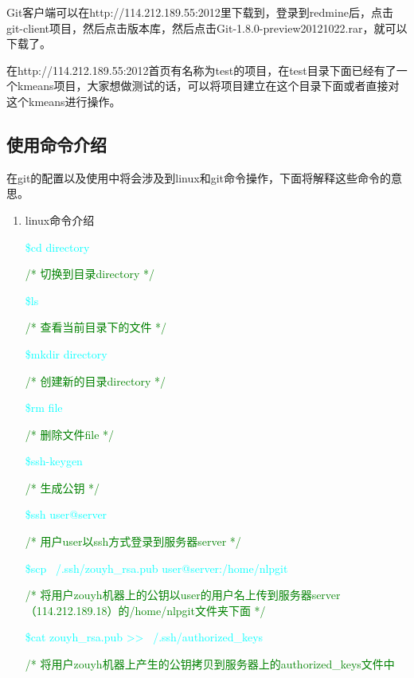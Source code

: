 Git客户端可以在http://114.212.189.55:2012里下载到，登录到redmine后，点击git-client项目，然后点击版本库，然后点击Git-1.8.0-preview20121022.rar，就可以下载了。

在http://114.212.189.55:2012首页有名称为test的项目，在test目录下面已经有了一个kmeans项目，大家想做测试的话，可以将项目建立在这个目录下面或者直接对这个kmeans进行操作。

\subsection{使用命令介绍}
在git的配置以及使用中将会涉及到linux和git命令操作，下面将解释这些命令的意思。

\begin{enumerate}
\item linux命令介绍

\textcolor{cyan}{\$cd directory}

\textcolor{green}{/* 切换到目录directory */}

\textcolor{cyan}{\$ls}
                                                              
\textcolor{green}{/* 查看当前目录下的文件 */}

\textcolor{cyan}{\$mkdir directory}                                                

\textcolor{green}{/* 创建新的目录directory */}

\textcolor{cyan}{\$rm file}
                                                          
\textcolor{green}{/* 删除文件file */}

\textcolor{cyan}{\$ssh-keygen}                                                      

\textcolor{green}{/* 生成公钥 */}

\textcolor{cyan}{\$ssh user@server}  
                                    
\textcolor{green}{/* 用户user以ssh方式登录到服务器server */}

\textcolor{cyan}{\$scp ~/.ssh/zouyh\_rsa.pub user@server:/home/nlpgit}
    
\textcolor{green}{/* 将用户zouyh机器上的公钥以user的用户名上传到服务器server（114.212.189.18）的/home/nlpgit文件夹下面 */}

\textcolor{cyan}{\$cat zouyh\_rsa.pub >> ~/.ssh/authorized\_keys }
                      
\textcolor{green}{/* 将用户zouyh机器上产生的公钥拷贝到服务器上的authorized\_keys文件中}


\end{enumerate}
